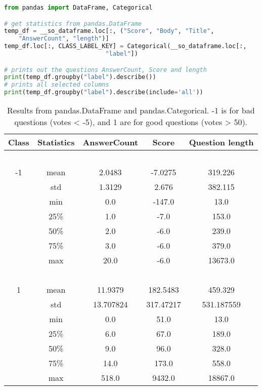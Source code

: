 \newpage
\begin{lstlisting}[caption={Getting Categorical data from pandas.DataFrame}, 
label={lst:pandas_categorical}, language={Python}, basicstyle=\small] 
from pandas import DataFrame, Categorical

# get statistics from pandas.DataFrame
temp_df = __so_dataframe.loc[:, ("Score", "Body", "Title", 
	"AnswerCount", "length")]
temp_df.loc[:, CLASS_LABEL_KEY] = Categorical(__so_dataframe.loc[:, 
							"label"])

# prints out the questions AnswerCount, Score and length
print(temp_df.groupby("label").describe())
# prints all selected columns
print(temp_df.groupby("label").describe(include='all'))
\end{lstlisting}

\begin{table}[tbp]
	\centering
	\begin{tabular}{| c | c | c | c |c |}
		\hline
		Class 		& Statistics	& AnswerCount		& Score 		& Question length 	\\ \hline
		~ 			& ~ 			& ~  				& ~ 			& ~					\\ \hline
		-1 			& mean 		& 2.0483 			& -7.0275 		& 319.226 		\\ \hline
		~ 			& std 		& 1.3129 			& 2.676 		& 382.115  		\\ \hline
		~ 			& min 		& 0.0 				& -147.0 		& 13.0  		\\ \hline
		~ 			& 25\% 		& 1.0 				& -7.0 			& 153.0 		\\ \hline
		~ 			& 50\% 		& 2.0 				& -6.0 			& 239.0  		\\ \hline
		~ 			& 75\% 		& 3.0 				& -6.0 			& 379.0  		\\ \hline
		~ 			& max 		& 20.0 				& -6.0 			& 13673.0  		\\ \hline
		~ 			& ~ 		& ~  				& ~ 			& ~				\\ \hline
		1 			& mean 		& 11.9379 			& 182.5483 		& 459.329		\\ \hline
		~ 			& std 		& 13.707824			& 317.47217 	& 531.187559  		\\ \hline
		~ 			& min 		& 0.0 				& 51.0 			& 13.0  		\\ \hline
		~ 			& 25\% 		& 6.0 				& 67.0 			& 189.0 		\\ \hline
		~ 			& 50\% 		& 9.0 				& 96.0 			& 328.0  		\\ \hline
		~ 			& 75\% 		& 14.0 				& 173.0 		& 558.0  		\\ \hline
		~ 			& max 		& 518.0 			& 9432.0 		& 18867.0  		\\ \hline
		
	\end{tabular}
	\caption{Results from pandas.DataFrame and pandas.Categorical. -1 is for bad questions (votes < -5), 
		and 1 are for good questions (votes > 50).}
	\label{tab:pandas_categorical}
\end{table}

